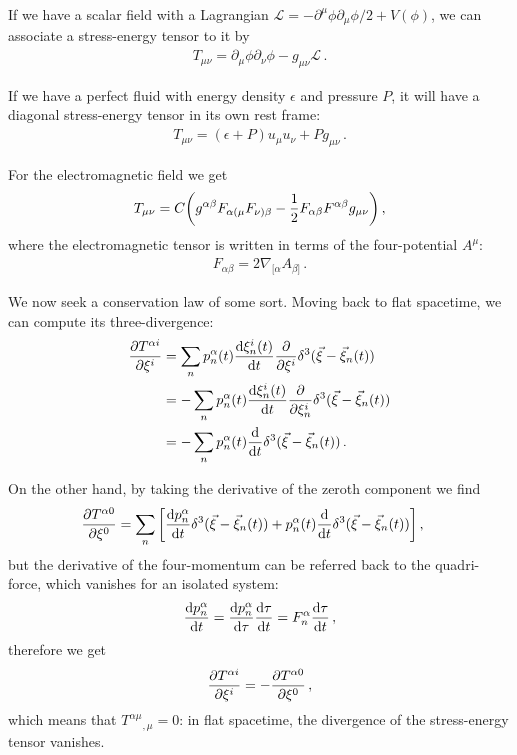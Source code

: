 \documentclass[main.tex]{subfiles}
\begin{document}
If we have a scalar field with a Lagrangian \(\mathscr{L} = - \partial^{\mu } \phi \partial_{\mu } \phi / 2 + V(\phi )\), we can associate a stress-energy tensor to it by 
%
\begin{align}
T_{\mu \nu } = \partial_{\mu } \phi \partial_{\nu } \phi 
- g_{\mu \nu } \mathscr{L}
\,.
\end{align}

If we have a perfect fluid with energy density \(\epsilon \) and pressure \(P\), it will have a diagonal stress-energy tensor in its own rest frame: 
%
\begin{align}
T_{\mu \nu } = (\epsilon + P) u_\mu u_\nu + P g_{\mu \nu }
\,.
\end{align}

For the electromagnetic field we get 
%
\begin{align}
T_{\mu \nu } = C \qty(g^{\alpha \beta } F_{\alpha (\mu } F_{\nu ) \beta } - \frac{1}{2} F_{\alpha \beta } F^{\alpha \beta } g_{\mu \nu })
\,,
\end{align}
%
where the electromagnetic tensor is written in terms of the four-potential \(A^{\mu }\):
%
\begin{align}
F_{\alpha \beta } = 2 \nabla_{[\alpha } A_{\beta ]}
\,.
\end{align}

We now seek a conservation law of some sort. 
Moving back to flat spacetime, we can compute its three-divergence:
%
\begin{align}
\pdv{T^{\alpha i}}{\xi^{i}} &=
\sum _{n} p^{\alpha }_{n} (t) \dv{\xi^{i}_n(t)}{t} \pdv{}{\xi^{i}} \delta^3 (\vec{\xi} - \vec{\xi}_n(t))  \\
&= - \sum _{n} p^{\alpha }_{n} (t) \dv{\xi^{i}_n(t)}{t} \pdv{}{\xi_n^{i}} \delta^3 (\vec{\xi} - \vec{\xi}_n(t))   \\
&= - \sum _{n} p^{\alpha }_{n} (t) \dv{}{t} \delta^3 (\vec{\xi} - \vec{\xi}_n(t))
\,.
\end{align}

On the other hand, by taking the derivative of the zeroth component we find
%
\begin{align}
\pdv{T^{\alpha 0}}{\xi^{0}} 
&= \sum _{n} \qty[
    \dv{p^{\alpha }_n}{t} (t) \delta^3(\vec{\xi} - \vec{\xi}_n(t)) 
    + p^{\alpha }_n (t) \dv{}{t} \delta^3(\vec{\xi} - \vec{\xi}_n(t))  
]
\,,
\end{align}
%
but the derivative of the four-momentum can be referred back to the quadri-force, which vanishes for an isolated system:
%
\begin{align}
\dv{p^{\alpha }_n}{t } = \dv{p^{\alpha }_n}{\tau } \dv{\tau }{t} = F^{\alpha }_n \dv{\tau }{t}
\,,
\end{align}
%
therefore we get 
%
\begin{align}
\pdv{T^{\alpha i}}{\xi^{i}} = - \pdv{T^{\alpha 0}}{\xi^{0}}
\,,
\end{align}
%
which means that \(T^{\alpha \mu }{}_{, \mu } = 0\): in flat spacetime, the divergence of the stress-energy tensor vanishes. 
\end{document}
